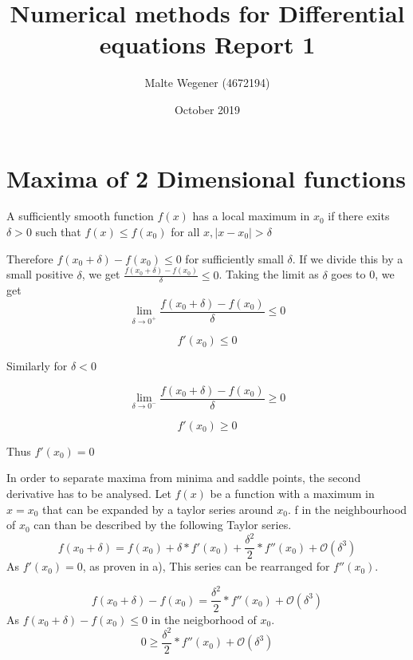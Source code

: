 \documentclass{article}
\title{Numerical methods for Differential equations Report 1}
\author{Malte Wegener (4672194)}
\date{October 2019}
\begin{document}
\maketitle
    
\section{Maxima of  2 Dimensional functions}

A sufficiently smooth function $f(x)$ has a local maximum in $x_{0}$ if there exits $\delta > 0$ such that $f(x) \leq f(x_{0})$ for all $x, \mid x - x_{0} \mid > \delta$ \par
Therefore $f(x_{0}+\delta)-f(x_{0}) \leq 0$ for sufficiently small $\delta$.
If we divide this by a small positive $\delta$, we get $\frac{f(x_{0}+\delta)-f(x_{0})}{\delta}\leq 0$.
Taking the limit as $\delta$ goes to 0, we get
\begin{equation}
   \lim_{\delta\to 0^{+}} \frac{f(x_{0}+\delta)-f(x_{0})}{\delta}\leq 0
\end{equation}

\begin{equation}
   f'(x_{0})\leq 0
\end{equation}

Similarly for $\delta < 0$

\begin{equation}
   \lim_{\delta\to 0^{-}} \frac{f(x_{0}+\delta)-f(x_{0})}{\delta}\geq 0
  \end{equation}
   
\begin{equation}
   f'(x_{0})\geq 0
\end{equation}

Thus $f'(x_{0}) = 0$

In order to separate maxima from minima and saddle points, the second derivative has to be analysed.
Let $f(x)$ be a function with a maximum in $x=x_{0}$ that can be expanded by a taylor series around $x_{0}$. f in the neighbourhood of $x_{0}$ can than be described by the following Taylor series.
\begin{equation}
    f(x_{0}+\delta) = f(x_{0})+\delta*f'(x_{0})+\frac{\delta^2}{2}*f''(x_{0}) + \mathcal{O}(\delta^3)
\end{equation}
As $f'(x_{0}) = 0$, as proven in a), This series can be rearranged for $f''(x_{0})$.

\begin{equation}
    f(x_{0}+\delta) - f(x_{0}) = \frac{\delta^2}{2}*f''(x_{0}) + \mathcal{O}(\delta^3)
\end{equation}
 As $f(x_{0}+\delta) - f(x_{0}) \leq 0$ in the neigborhood of $x_{0}$.
\begin{equation}
    0 \geq \frac{\delta^2}{2}*f''(x_{0}) + \mathcal{O}(\delta^3)
\end{equation}
\end{document}
